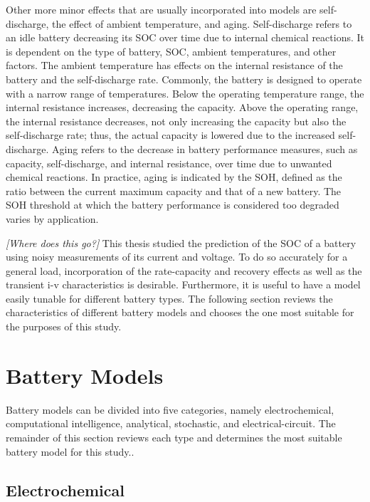 \documentclass[../zhang_thesis.tex]{subfiles}
\begin{document}
Other more minor effects that are usually incorporated into models are self-discharge, the effect of ambient temperature, and aging. Self-discharge refers to an idle battery decreasing its SOC over time due to internal chemical reactions. It is dependent on the type of battery, SOC, ambient temperatures, and other factors. The ambient temperature has effects on the internal resistance of the battery and the self-discharge rate. Commonly, the battery is designed to operate with a narrow range of temperatures. Below the operating temperature range, the internal resistance increases, decreasing the capacity. Above the operating range, the internal resistance decreases, not only increasing the capacity but also the self-discharge rate; thus, the actual capacity is lowered due to the increased self-discharge. Aging refers to the decrease in battery performance measures, such as capacity, self-discharge, and internal resistance, over time due to unwanted chemical reactions. In practice, aging is indicated by the SOH, defined as the ratio between the current maximum capacity and that of a new battery. The SOH threshold at which the battery performance is considered too degraded varies by application.

\emph{[Where does this go?]} This thesis studied the prediction of the SOC of a battery using noisy measurements of its current and voltage. To do so accurately for a general load, incorporation of the rate-capacity and recovery effects as well as the transient i-v characteristics is desirable. Furthermore, it is useful to have a model easily tunable for different battery types. The following section reviews the characteristics of different battery models and chooses the one most suitable for the purposes of this
study.


\section{Battery Models}

Battery models can be divided into five categories, namely electrochemical, computational intelligence, analytical, stochastic, and electrical-circuit. The remainder of this section reviews each type and determines the most suitable battery model for this study..

\subsection{Electrochemical}
\end{document}
